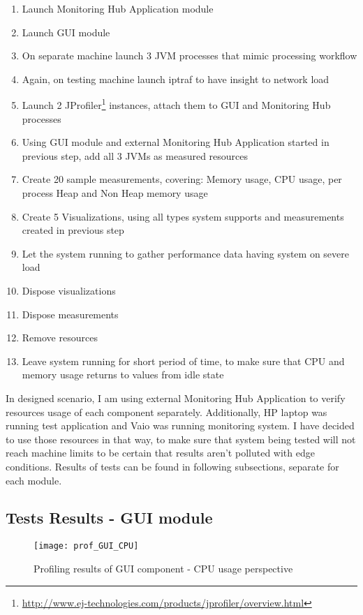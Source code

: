\begin{enumerate}
\item Launch Monitoring Hub Application module
\item Launch GUI module
\item On separate machine launch 3 JVM processes that mimic processing workflow
\item Again, on testing machine launch iptraf to have insight to network load
\item Launch 2 JProfiler\footnote{\url{http://www.ej-technologies.com/products/jprofiler/overview.html}} instances, attach them to GUI and Monitoring Hub processes
\item Using GUI module and external Monitoring Hub Application started in previous step, add all 3 JVMs as measured resources
\item Create 20 sample measurements, covering: Memory usage, CPU usage, per process Heap and Non Heap memory usage
\item Create 5 Visualizations, using all types system supports and measurements created in previous step
\item Let the system running to gather performance data having system on severe load
\item Dispose visualizations
\item Dispose measurements
\item Remove resources
\item Leave system running for short period of time, to make sure that CPU and memory usage returns to values from idle state
\end{enumerate}

In designed scenario, I am using external Monitoring Hub Application to verify resources usage of each component separately. Additionally, HP laptop was running test application and Vaio was running monitoring system. I have decided to use those resources in that way, to make sure that system being tested will not reach machine limits to be certain that results aren\rq{}t polluted with edge conditions. Results of tests  can be found in following subsections, separate for each module.

\subsection{Tests Results - GUI module}


\begin{figure}[ht]
  \centering
  \texttt{[image: prof\_GUI\_CPU]}
  \caption{Profiling results of GUI component - CPU usage perspective}
  \label{fig:prof_GUI_CPU}
\end{figure}

